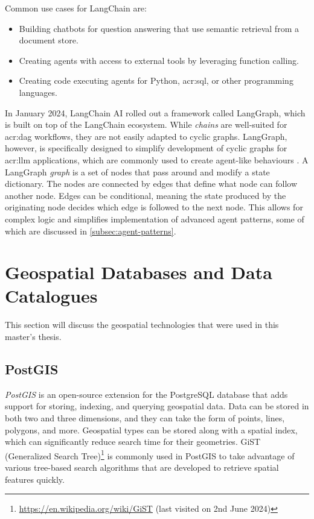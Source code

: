 Common use cases for LangChain are:

\begin{itemize}
    \item Building chatbots for question answering that use semantic retrieval from a document store.
    \item Creating agents with access to external tools by leveraging function calling.
    \item Creating code executing agents for Python, \acrshort{acr:sql}, or other programming languages.
\end{itemize}

In January 2024, LangChain AI rolled out a framework called LangGraph, which is built on top of the LangChain ecosystem. While \textit{chains} are well-suited for \gls{acr:dag} workflows, they are not easily adapted to cyclic graphs. LangGraph, however, is specifically designed to simplify development of cyclic graphs for \acrshort{acr:llm} applications, which are commonly used to create agent-like behaviours \citep{langchainaiLangchainaiLanggraph2024}. A LangGraph \textit{graph} is a set of nodes that pass around and modify a state dictionary. The nodes are connected by edges that define what node can follow another node. Edges can be conditional, meaning the state produced by the originating node decides which edge is followed to the next node. This allows for complex logic and simplifies implementation of advanced agent patterns, some of which are discussed in \autoref{subsec:agent-patterns}.


\section{Geospatial Databases and Data Catalogues}
\label{sec:geo-dbs-and-data-catalogues}

This section will discuss the geospatial technologies that were used in this master's thesis.

\subsection{PostGIS}
\label{subsec:postgis}

\textit{PostGIS} \citep{PostGIS2001} is an open-source extension for the PostgreSQL database that adds support for storing, indexing, and querying geospatial data. Data can be stored in both two and three dimensions, and they can take the form of points, lines, polygons, and more. Geospatial types can be stored along with a spatial index, which can significantly reduce search time for their geometries. GiST (Generalized Search Tree)\footnote{\url{https://en.wikipedia.org/wiki/GiST} (last visited on 2nd June 2024)} is commonly used in PostGIS to take advantage of various tree-based search algorithms that are developed to retrieve spatial features quickly.

